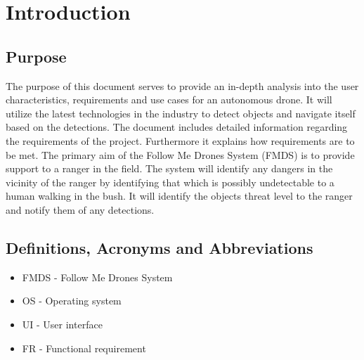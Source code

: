 \chapter{Introduction}
\section{Purpose}
\begin{flushleft}
	The purpose of this document serves to provide an in-depth analysis into the user characteristics, requirements and use cases for an autonomous drone. 
	It will utilize the latest technologies in the industry to detect objects and navigate itself based on the detections. 
	The document includes detailed information regarding the requirements of the project.
	Furthermore it explains how requirements are to be met.
	\newline
	\newline
	The primary aim of the Follow Me Drones System (FMDS) is to provide support to a ranger in the field. The system will identify any dangers in the vicinity 
	of the ranger by identifying that which is possibly undetectable to a human walking in the bush. It will identify the objects threat level to the ranger and notify them of any detections. 
\end{flushleft}


\section{Definitions, Acronyms and Abbreviations}

\begin{itemize}
	\item FMDS - Follow Me Drones System
	\item OS - Operating system
	\item UI - User interface
	\item FR - Functional requirement
\end{itemize}

